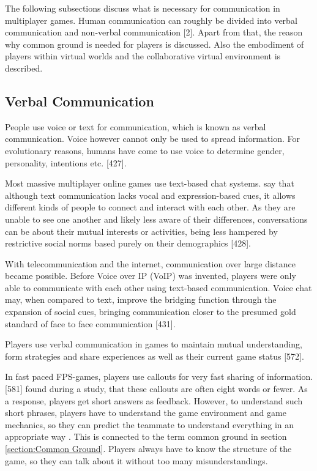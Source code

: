 The following subsections discuss what is necessary for communication in multiplayer games.
Human communication can roughly be divided into verbal communication and non-verbal communication \autocite{Kujanpaa2003SupportingAvatars}[2]. 
Apart from that, the reason why common ground is needed for players is discussed. Also the embodiment of players within virtual worlds and the collaborative virtual environment is described.



\subsection{Verbal Communication}
\label{section:Verbal Communication}

People use voice or text for communication, which is known as verbal communication.
Voice however cannot only be used to spread information.
For evolutionary reasons, humans have come to use voice to determine gender, personality, intentions etc. \autocite{Williams2007CanCommunity}[427].

Most massive multiplayer online games use text-based chat systems.
\textcite{Williams2007CanCommunity} say that although text communication lacks vocal and expression-based cues, it allows different kinds of people to connect and interact with each other. As they are unable to see one another and likely less aware of their differences, conversations can be about their mutual interests or activities, being less hampered by restrictive social norms based purely on their demographics \autocite{Williams2007CanCommunity}[428].

With telecommunication and the internet, communication over large distance became possible. Before Voice over IP (VoIP) was invented, players were only able to communicate with each other using text-based communication. Voice chat may, when compared to text, improve the bridging function through the expansion of social cues, bringing communication closer to the presumed gold standard of face to face communication \autocite{Williams2007CanCommunity}[431].

Players use verbal communication in games to maintain mutual understanding, form strategies and share experiences as well as their current game status \autocite{Cheung2012CommunicationGaming}[572].

In fast paced FPS-games, players use callouts for very fast sharing of information. \textcite{Tang2012VerbalGames}[581] found during a study, that these callouts are often eight words or fewer. As a response, players get short answers as feedback.
However, to understand such short phrases, players have to understand the game environment and game mechanics, so they can predict the teammate to understand everything in an appropriate way \autocite{Tang2012VerbalGames}. This is connected to the term common ground in section \ref{section:Common Ground}. Players always have to know the structure of the game, so they can talk about it without too many misunderstandings.

